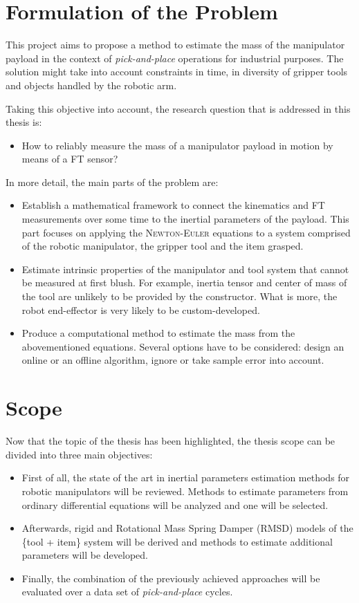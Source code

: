 \documentclass[/home/francois/latex/report/main.tex]{subfiles}
\begin{document}
\section{Formulation of the Problem}

This project aims to propose a method to estimate the mass of the manipulator payload in the context of \textit{pick-and-place} operations for industrial purposes. The solution might take into account constraints in time, in diversity of gripper tools and objects handled by the robotic arm.

Taking this objective into account, the research question that is addressed in this thesis is:

\begin{itemize}
 \item[] How to reliably measure the mass of a manipulator payload in motion by means of a \ac{FT} sensor?
\end{itemize}

In more detail, the main parts of the problem are:

\begin{itemize}
 \item Establish a mathematical framework to connect the kinematics and \ac{FT} measurements over some time to the inertial parameters of the payload. This part focuses on applying the \textsc{Newton-Euler} equations to a system comprised of the robotic manipulator, the gripper tool and the item grasped.
 \item Estimate intrinsic properties of the manipulator and tool system that cannot be measured at first blush. For example, inertia tensor and center of mass of the tool are unlikely to be provided by the constructor. What is more, the robot end-effector is very likely to be custom-developed.
 \item Produce a computational method to estimate the mass from the abovementioned equations. Several options have to be considered: design an online or an offline algorithm, ignore or take sample error into account.
\end{itemize}

\section{Scope}

Now that the topic of the thesis has been highlighted, the thesis scope can be divided into three main objectives:

\begin{itemize}
    \item First of all, the state of the art in inertial parameters estimation methods for robotic manipulators will be reviewed. Methods to estimate parameters from ordinary differential equations will be analyzed and one will be selected.
    \item Afterwards, rigid and Rotational Mass Spring Damper (RMSD) models of the \{tool + item\} system will be derived and methods to estimate additional parameters will be developed.
    \item Finally, the combination of the previously achieved approaches will be evaluated over a data set of \textit{pick-and-place} cycles.
\end{itemize}
\end{document}
